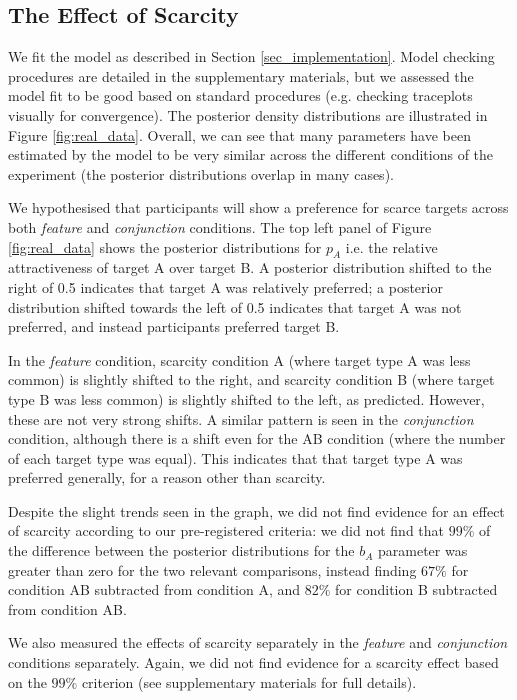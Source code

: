 \documentclass[12pt]{article}
\begin{document}
\subsection{The Effect of Scarcity}

We fit the model as described in Section \ref{sec_implementation}. Model checking procedures are detailed in the supplementary materials, but we assessed the model fit to be good based on standard procedures (e.g. checking traceplots visually for convergence). The posterior density distributions are illustrated in Figure \ref{fig:real_data}. Overall, we can see that many parameters have been estimated by the model to be very similar across the different conditions of the experiment (the posterior distributions overlap in many cases).

We hypothesised that participants will show a preference for scarce targets across both \textit{feature} and \textit{conjunction} conditions. The top left panel of Figure \ref{fig:real_data} shows the posterior distributions for $p_A$ i.e. the relative attractiveness of target A over target B. A posterior distribution shifted to the right of 0.5 indicates that target A was relatively preferred; a posterior distribution shifted towards the left of 0.5 indicates that target A was not preferred, and instead participants preferred target B.

In the \textit{feature} condition, scarcity condition A (where target type A was less common) is slightly shifted to the right, and scarcity condition B (where target type B was less common) is slightly shifted to the left, as predicted. However, these are not very strong shifts. A similar pattern is seen in the \textit{conjunction} condition, although there is a shift even for the AB condition (where the number of each target type was equal). This indicates that that target type A was preferred generally, for a reason other than scarcity.

Despite the slight trends seen in the graph, we did not find evidence for an effect of scarcity according to our pre-registered criteria: we did not find that $99\%$ of the difference between the posterior distributions for the $b_A$ parameter was greater than zero for the two relevant comparisons, instead finding $67\%$ for condition AB subtracted from condition A, and $82\%$ for condition B subtracted from condition AB. 

We also measured the effects of scarcity separately in the \textit{feature} and \textit{conjunction} conditions separately. Again, we did not find evidence for a scarcity effect based on the $99\%$ criterion (see supplementary materials for full details).
\end{document}
